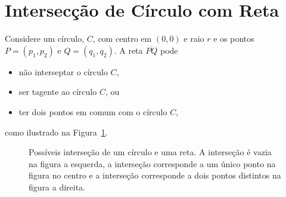 %
%
%

\section{Intersecção de Círculo com Reta} \label{sse:circle_line}
\nocite{Wolfram:CircleLine}
Considere um círculo, $C$, com centro em $(0, 0)$ e raio $r$ e os pontos $P =
(p_1, p_2)$ e $Q = (q_1, q_2)$. A reta $\overline{PQ}$ pode
\begin{itemize}
    \item não interseptar o círculo $C$,
    \item ser tagente ao círculo $C$, ou
    \item ter dois pontos em comum com o círculo $C$,
\end{itemize}
como ilustrado na Figura~\ref{fig:circle_line}.
\begin{figure}[!htb]
    \centering
    \caption{Possíveis interseção de um círculo e uma reta. A interseção é
    vazia na figura a esquerda, a interseção corresponde a um único ponto na
    figura no centro e a interseção corresponde a dois pontos distintos na
    figura a direita.}
    \label{fig:circle_line}
\end{figure}

